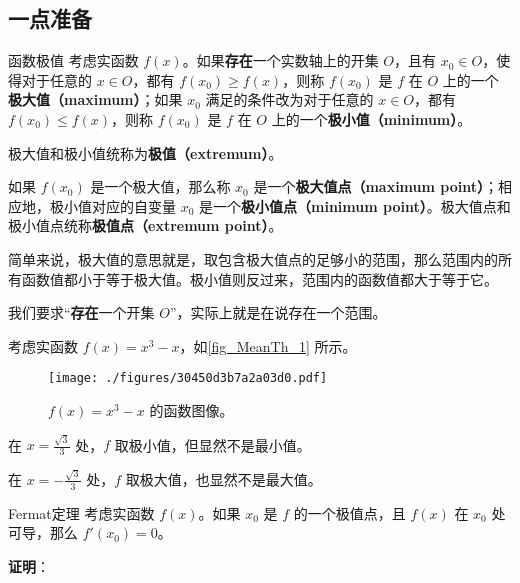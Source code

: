 

\subsection{一点准备}

\begin{definition}{函数极值}
考虑实函数 $f(x)$。如果\textbf{存在}一个实数轴上的开集 $O$，且有 $x_0\in O$，使得对于任意的 $x\in O$，都有 $f(x_0)\geq f(x)$，则称 $f(x_0)$ 是 $f$ 在 $O$ 上的一个\textbf{极大值（maximum）}；如果 $x_0$ 满足的条件改为对于任意的 $x\in O$，都有 $f(x_0)\leq f(x)$，则称 $f(x_0)$ 是 $f$ 在 $O$ 上的一个\textbf{极小值（minimum）}。

极大值和极小值统称为\textbf{极值（extremum）}。

如果 $f(x_0)$ 是一个极大值，那么称 $x_0$ 是一个\textbf{极大值点（maximum point）}；相应地，极小值对应的自变量 $x_0$ 是一个\textbf{极小值点（minimum point）}。极大值点和极小值点统称\textbf{极值点（extremum point）}。
\end{definition}


简单来说，极大值的意思就是，取包含极大值点的足够小的范围，那么范围内的所有函数值都小于等于极大值。极小值则反过来，范围内的函数值都大于等于它。

我们要求“\textbf{存在}一个开集 $O$”，实际上就是在说存在一个范围。

\begin{example}{}\label{ex_MeanTh_1}
考虑实函数 $f(x)=x^3-x$，如\autoref{fig_MeanTh_1} 所示。

\begin{figure}[ht]
\centering
\texttt{[image: ./figures/30450d3b7a2a03d0.pdf]}
\caption{$f(x)=x^3-x$ 的函数图像。} \label{fig_MeanTh_1}
\end{figure}

在 $x=\frac{\sqrt{3}}{3}$ 处，$f$ 取极小值，但显然不是最小值。

在 $x=-\frac{\sqrt{3}}{3}$ 处，$f$ 取极大值，也显然不是最大值。


\end{example}


\begin{theorem}{Fermat定理}\label{the_MeanTh_1}
考虑实函数 $f(x)$。如果 $x_0$ 是 $f$ 的一个极值点，且 $f(x)$ 在 $x_0$ 处可导，那么 $f'(x_0)=0$。
\end{theorem}

\textbf{证明}：

